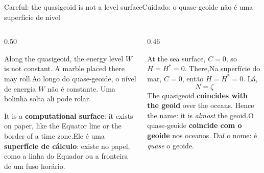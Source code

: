 \documentclass[aspectratio=169,11pt]{beamer}
\newcommand{\tr}[2]{\ifEN#2\else#1\fi}
\newcommand{\bnum}[1]{\textbf{\textcolor{mTeal}{#1}}}
\begin{document}
\begin{frame}{\tr{Cuidado: o quase-geoide não é uma superfície de nível}{Careful: the
  quasigeoid is not a level surface}}
  \begin{columns}[T]
    \begin{column}{0.50\textwidth}
      \begin{armadilha}[title={\tr{A água não o enxerga}{Water does not see it}}]
        \tr{Ao longo do quase-geoide, o nível de energia $W$ \alert{não é constante}. Uma
        bolinha solta ali pode rolar.}{Along the quasigeoid, the energy level $W$ \alert{is
        not constant}. A marble placed there may roll.}
        \medskip

        \tr{Ele é uma \bnum{superfície de cálculo}: existe no papel, como a linha do Equador ou
        a fronteira de um fuso horário.}{It is a \bnum{computational surface}: it exists on
        paper, like the Equator line or the border of a time zone.}
      \end{armadilha}
    \end{column}
    \begin{column}{0.46\textwidth}
      \begin{ideia}[title={\tr{Mas no mar\ldots}{But at sea\ldots}}]
        \tr{Na superfície do mar, $C = 0$, então $H = H^{*} = 0$. Lá,}{At the sea surface,
        $C = 0$, so $H = H^{*} = 0$. There,}
        \[ N = \zeta \]
        \tr{O quase-geoide \bnum{coincide com o geoide} nos oceanos. Daí o nome: é
        \emph{quase} o geoide.}{The quasigeoid \bnum{coincides with the geoid} over the
        oceans. Hence the name: it is \emph{almost} the geoid.}
      \end{ideia}
    \end{column}
  \end{columns}
\end{frame}
\end{document}
